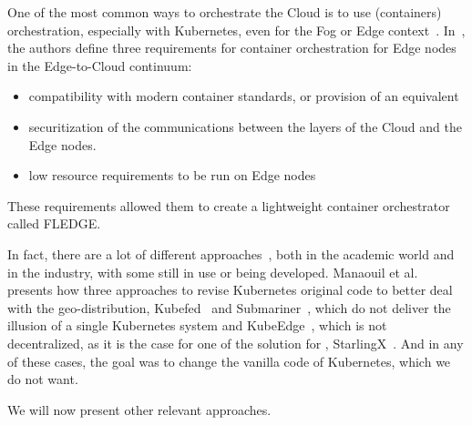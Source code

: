 One of the most common ways to orchestrate the Cloud is to use
(containers) orchestration, especially with Kubernetes, even for the
Fog or Edge context~\cite{TPTE21, UVK21, UDAD+21, WSMB18, BGCCV19,
  SZPDC17}.
%
In~\cite{GTV19}, the authors define three requirements for container
orchestration for Edge nodes in the Edge-to-Cloud continuum:

\begin{itemize}
\item compatibility with modern container standards, or provision of
  an equivalent
\item securitization of the communications between the layers of the
  Cloud and the Edge nodes.
\item low resource requirements to be run on Edge nodes
\end{itemize}
These requirements allowed them to create a lightweight container
orchestrator called FLEDGE.

In fact, there are a lot of different approaches~\cite{BW22}, both in
the academic world and in the industry, with some still in use or
being developed.
%
Manaouil et al.\cite{ML20} presents how three approaches to revise
Kubernetes original code to better deal with the geo-distribution, \ie
Kubefed~\cite{kubefed} and Submariner~\cite{submariner}, which do not
deliver the illusion of a single Kubernetes system and
KubeEdge~\cite{XSXH18, kubeedge}, which is not decentralized, as it is
the case for one of the solution for \os, StarlingX~\cite{starlingx}.
%
And in any of these cases, the goal was to change the vanilla code of
Kubernetes, which we do not want.

We will now present other relevant approaches.




